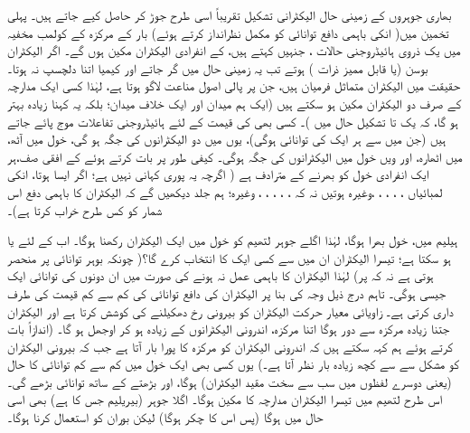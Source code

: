 بھاری جوہروں کے زمینی حال الیکٹرانی تشکیل تقریباً اسی طرح جوڑ کر حاصل کیے جاتے ہیں۔ پہلی تخمین میں( انکی باہمی دافع توانائی کو مکمل نظرانداز کرتے ہوئے) بار  کے مرکزہ کے کولمب مخفیہ میں یک ذروی ہائیڈروجنی حالات ، جنہیں  کہتے ہیں، کے انفرادی الیکٹران مکین ہوں گے۔ اگر الیکٹران بوسن (یا قابل ممیز ذرات ) ہوتے تب یہ زمینی حال  میں گر جاتے اور کیمیا اتنا دلچسپ نہ ہوتا۔ حقیقت میں الیکٹران متماثل فرمیان ہیں، جن پر پالی اصول مناعت لاگو ہوتا ہے، لہٰذا کسی ایک مدارچہ کے صرف دو الیکٹران مکین ہو سکتے ہیں (ایک ہم میدان اور ایک خلاف میدان؛ بلکہ یہ کہنا زیادہ بہتر ہو گا، کہ یک تا تشکیل حال میں )۔ کسی بھی  کی قیمت کے لئے  ہائیڈروجنی تفاعلات موج پائے جاتے ہیں (جن میں سے ہر ایک کی توانائی  ہوگی)، یوں   میں دو الیکٹرانوں کی جگہ ہو گی،  خول میں آٹھ،  میں اٹھارہ، اور ویں خول میں  الیکٹرانوں کی جگہ ہوگی۔ کیفی طور پر بات کرتے ہوئے  کے افقی صف،ہر ایک انفرادی خول کو بھرنے کے مترادف ہے ( اگرچہ یہ پوری کہانی نہیں ہے؛ اگر ایسا ہوتا، انکی لمبائیاں ، ، ، ، ،وغیرہ ہوتیں نہ کہ ، ، ، ، ، وغیرہ؛ ہم جلد دیکھیں گے کہ الیکٹران کا باہمی دفع اس شمار کو کس طرح خراب کرتا ہے)۔

ہیلیم میں،  خول بھرا ہوگا، لہٰذا اگلے جوہر لتھیم  کو  خول میں ایک الیکٹران رکھنا ہوگا۔ اب  کے لئے  یا  ہو سکتا ہے؛ تیسرا الیکٹران ان میں سے کسی ایک کا انتخاب کرے گا؟( چونکہ بوہر توانائی  پر منحصر ہوتی ہے نہ کہ  پر) لہٰذا الیکٹران کا باہمی عمل نہ ہونے کی صورت میں ان دونوں کی توانائی ایک جیسی ہوگی۔ تاہم درج ذیل وجہ کی بنا پر الیکٹران کی دافع توانائی  کی کم سے کم قیمت کی طرف داری کرتی ہے۔ زاویائی معیار حرکت الیکٹران کو بیرونی رخ دھکیلنے کی کوشش کرتا ہے اور الیکٹران جتنا زیادہ مرکزہ سے دور ہوگا اتنا مرکزہ، اندرونی الیکٹرانوں کے زیادہ  ہو کر اوجھل ہو گا۔ (اندازاً بات کرتے ہوئے ہم کہہ سکتے ہیں کہ اندرونی الیکٹران کو مرکزہ کا پورا بار   آتا ہے جب کہ بیرونی الیکٹران کو مشکل سے  سے کچھ زیادہ بار نظر آتا ہے۔) یوں کسی بھی ایک خول میں کم سے کم توانائی کا حال (یعنی دوسرے لفظوں میں سب سے سخت مقید الیکٹران)  ہوگا، اور بڑھتے  کے ساتھ توانائی بڑھے گی۔ اس طرح لتھیم میں تیسرا الیکٹران مدارچہ  کا مکین ہوگا۔ اگلا جوہر (بیریلیم جس کا  ہے) بھی اسی حال میں ہوگا (پس اس کا چکر  ہوگا) لیکن بوران  کو  استعمال کرنا ہوگا۔ 
 
